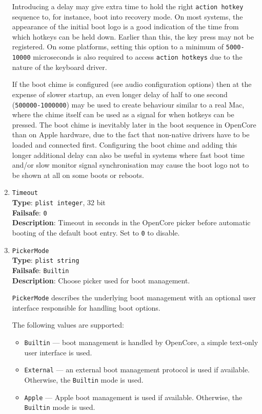 \documentclass[]{article}
\providecommand{\tightlist}{%
  \setlength{\itemsep}{0pt}\setlength{\parskip}{0pt}}
\begin{document}
\begin{enumerate}
  Introducing a delay may give extra time to hold the right \texttt{action hotkey}
  sequence to, for instance, boot into recovery mode. On most systems, the appearance
  of the initial boot logo is a good indication of the time from which hotkeys can be
  held down. Earlier than this, the key press may not be registered. On some platforms,
  setting this option to a minimum of \texttt{5000-10000} microseconds is also required
  to access \texttt{action hotkeys} due to the nature of the keyboard driver.

  If the boot chime is configured (see audio configuration options) then at the expense
  of slower startup, an even longer delay of half to one second (\texttt{500000-1000000})
  may be used to create behaviour similar to a real Mac, where the chime itself can be used
  as a signal for when hotkeys can be pressed. The boot chime is inevitably later in the boot
  sequence in OpenCore than on Apple hardware, due to the fact that non-native drivers
  have to be loaded and connected first. Configuring the boot chime and adding this longer
  additional delay can also be useful in systems where fast boot time and/or slow monitor signal
  synchronisation may cause the boot logo not to be shown at all on some boots or reboots.

\item
  \texttt{Timeout}\\
  \textbf{Type}: \texttt{plist\ integer}, 32 bit\\
  \textbf{Failsafe}: \texttt{0}\\
  \textbf{Description}: Timeout in seconds in the OpenCore picker before
  automatic booting of the default boot entry. Set to \texttt{0} to disable.

\item
  \texttt{PickerMode}\\
  \textbf{Type}: \texttt{plist\ string}\\
  \textbf{Failsafe}: \texttt{Builtin}\\
  \textbf{Description}: Choose picker used for boot management.

  \texttt{PickerMode} describes the underlying boot management with
  an optional user interface responsible for handling boot options.

  The following values are supported:

  \begin{itemize}
  \tightlist
  \item \texttt{Builtin} --- boot management is handled by OpenCore, a simple
  text-only user interface is used.
  \item \texttt{External} --- an external boot management protocol is used
  if available. Otherwise, the \texttt{Builtin} mode is used.
  \item \texttt{Apple} --- Apple boot management is used if available.
  Otherwise, the \texttt{Builtin} mode is used.
  \end{itemize}


\end{enumerate}
\end{document}
